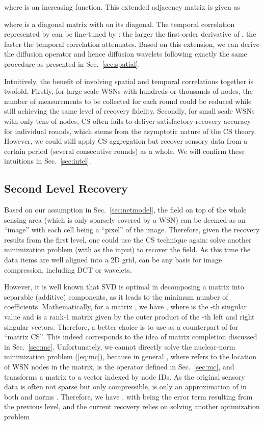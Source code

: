 \documentclass[conference]{IEEEtran}
\begin{document}
where  is an increasing function. This extended adjacency matrix is given as

where  is a diagonal matrix with  on its diagonal. The temporal correlation represented by  can be fine-tuned by : the larger the first-order derivative of , the faster the temporal correlation attenuates. Based on this extension, we can derive the diffusion operator and hence diffusion wavelets following exactly the same procedure as presented in Sec.~\ref{sec:spatial}.

      Intuitively, the benefit of involving spatial and temporal correlations together is twofold. Firstly, for large-scale WSNs with hundreds or thousands of nodes, the number of measurements  to be collected for each round could be reduced while still achieving the same level of recovery fidelity. Secondly, for small scale WSNs with only tens of nodes, CS often fails to deliver satisfactory recovery accuracy for individual rounds, which stems from the asymptotic nature of the CS theory. However, we could still apply CS aggregation but recover sensory data from a certain period (several consecutive rounds) as a whole. We will confirm these intuitions in Sec.~\ref{sec:intel}.

  \subsection{Second Level Recovery} \label{sec:2level}
Based on our assumption in Sec.~\ref{sec:netmodel}, the field on top of the whole sensing area (which is only sparsely covered by a WSN) can be deemed as an ``image'' with each cell being a ``pixel'' of the image. Therefore, given the recovery results  from the first level, one could use the CS technique again: solve another  minimization problem (with  as the input) to recover the field. As this time the data items are well aligned into a 2D grid,  can be any basis for image compression, including DCT or wavelets.

    However, it is well known that SVD is optimal in decomposing a matrix into separable (additive) components, as it leads to the minimum number of coefficients. Mathematically, for a matrix , we have , where  is the -th singular value and  is a rank-1 matrix given by the outer product of the -th left and right singular vectors. Therefore, a better choice is to use  as a counterpart of  for ``matrix CS''. This indeed corresponds to the idea of matrix completion discussed in Sec.~\ref{sec:mc}. Unfortunately, we cannot directly solve the nuclear-norm minimization problem (\ref{eq:mc}), because in general , where  refers to the location of WSN nodes in the matrix,  is the operator defined in Sec.~\ref{sec:mc}, and  transforms a matrix to a vector indexed by node IDs. As the original sensory data  is often not sparse but only compressible,  is only an approximation of  in both  and  norms \cite{Candes-SPMag08}. Therefore, we have , with  being the error term resulting from the previous level, and the current recovery relies on solving another optimization problem
    
\end{document}
